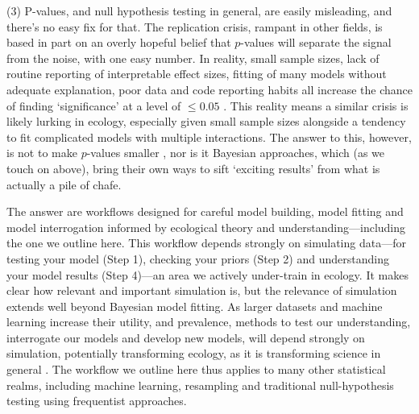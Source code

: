 \documentclass[11pt]{article}
\begin{document}
{(3) P-values, and null hypothesis testing in general, are easily misleading, and there’s no easy fix for that. The replication crisis, rampant in other fields, is based in part on an overly hopeful belief that $p$-values will separate the signal from the noise, with one easy number. In reality, small sample sizes, lack of routine reporting of interpretable effect sizes, fitting of many models without adequate explanation, poor data and code reporting habits all increase the chance of finding `significance' at a level of $\le0.05$ \citep{halsey2015,loken2017}. This reality means a similar crisis is likely lurking in ecology, especially given small sample sizes alongside a tendency to fit complicated models with multiple interactions. The answer to this, however, is not to make $p$-values smaller \citep{halsey2015,colquhoun2017}, nor is it Bayesian approaches, which (as we touch on above), bring their own ways to sift `exciting results' from what is actually a pile of chafe. %

The answer are workflows designed for careful model building, model fitting and model interrogation informed by ecological theory and understanding---including the one we outline here. %
This workflow depends strongly on simulating data---for testing your model (Step 1), checking your priors (Step 2) and understanding your model results (Step 4)---an area we actively under-train in ecology. It makes clear how relevant and important simulation is, but the relevance of simulation extends well beyond Bayesian model fitting. As larger datasets and machine learning increase their utility, and prevalence, methods to test our understanding, interrogate our models and develop new models, will depend strongly on simulation, potentially transforming ecology, as it is transforming science in general \citep{flynn2022digitaltwin,kuntz2022,oren2017}. The workflow we outline here thus applies to many other statistical realms, including machine learning, resampling and traditional null-hypothesis testing using frequentist approaches.

}
\end{document}

